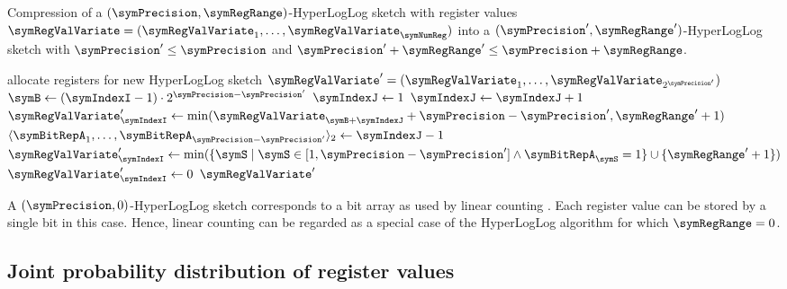 \documentclass[a4paper]{scrartcl}
\begin{document}
\begin{algorithm}
\caption{Compression of a $(\symPrecision, \symRegRange)$-HyperLogLog sketch with register values $\boldsymbol{\symRegValVariate}=(\symRegValVariate_1,\ldots,\symRegValVariate_\symNumReg)$ into a $(\symPrecision', \symRegRange')$-HyperLogLog sketch with $\symPrecision'\leq\symPrecision$ and $\symPrecision'+\symRegRange' \leq\symPrecision + \symRegRange$.}
\label{alg:compress}
\begin{algorithmic}
\State allocate registers for new HyperLogLog sketch $\boldsymbol{\symRegValVariate}' = (\symRegValVariate_1,\ldots,\symRegValVariate_{2^{\symPrecision'}})$
\State $\symB \gets (\symIndexI-1)\cdot 2^{\symPrecision-\symPrecision'}$
\State $\symIndexJ\gets 1$
\State $\symIndexJ\gets\symIndexJ+1$
\EndWhile
{}
\State $\symRegValVariate'_\symIndexI \gets \min(\symRegValVariate_{\symB+\symIndexJ} + \symPrecision-\symPrecision',\symRegRange'+1)$
\State $\langle \symBitRepA_1, \ldots, \symBitRepA_{\symPrecision-\symPrecision'}\rangle_2 \gets \symIndexJ-1$
\State $\symRegValVariate'_\symIndexI \gets 
\min(\{\symS\mid \symS \in [1, \symPrecision-\symPrecision']  \wedge  \symBitRepA_\symS = 1\} \cup \{\symRegRange'+1\})$
\Else
\State $\symRegValVariate'_\symIndexI \gets 0$
\EndIf
\EndFor
\State \Return $\boldsymbol{\symRegValVariate}'$
\EndFunction
\end{algorithmic}
\end{algorithm}

A $(\symPrecision, 0)$-HyperLogLog sketch corresponds to a bit array as used by linear counting \cite{Whang1990}. Each register value can be stored by a single bit in this case. Hence, linear counting can be regarded as a special case of the HyperLogLog algorithm for which $\symRegRange = 0$.

\subsection{Joint probability distribution of register values}
\end{document}
